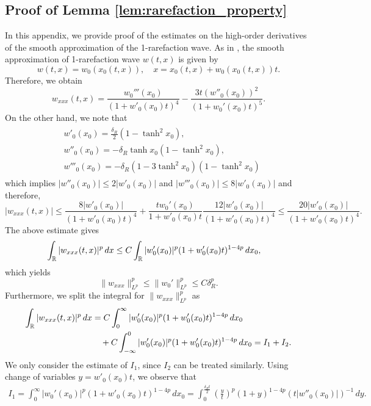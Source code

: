 \documentclass[11pt,reqno]{amsart}
\begin{document}
\begin{appendix}

\section{Proof of Lemma \ref{lem:rarefaction_property}}\label{sec:app-rarefaction-proof}
\setcounter{equation}{0}
In this appendix, we provide proof of the estimates on the high-order derivatives of the smooth approximation of the 1-rarefaction wave. As in \cite{MN86}, the smooth approximation of 1-rarefaction wave $w(t,x)$ is given by
\[w(t,x)=w_0(x_0(t,x)),\quad x=x_0(t,x)+w_0(x_0(t,x))t.\]
Therefore, we obtain
\[w_{xxx}(t,x) = \frac{w_0'''(x_0)}{(1+w'_0(x_0)t)^4}-\frac{3t(w''_0(x_0))^2}{(1+w_0'(x_0)t)^5}.\]
On the other hand, we note that
\begin{align}
	\begin{aligned}\label{w_0}
		&w'_0(x_0) = \frac{\delta_R}{2}(1-\tanh^2 x_0),\\
		&w''_0(x_0) = -\delta_R \tanh x_0 (1-\tanh^2 x_0),\\
		&w'''_0(x_0) = -\delta_R (1-3\tanh^2 x_0)(1-\tanh^2 x_0)
	\end{aligned}
\end{align}
which implies $|w''_0(x_0)|\le 2|w'_0(x_0)|$ and $|w'''_0(x_0)|\le 8|w'_0(x_0)|$ and therefore,
\[|w_{xxx}(t,x)|\le \frac{8|w'_0(x_0)|}{(1+w'_0(x_0)t)^4}+\frac{tw_0'(x_0)}{1+w'_0(x_0)t}\frac{12|w'_0(x_0)|}{(1+w'_0(x_0)t)^4}\le \frac{20|w'_0(x_0)|}{(1+w'_0(x_0)t)^4}.\]
The above estimate gives
\begin{align*}
	\int_{\mathbb{R}}|w_{xxx}(t,x)|^p\,dx&\le C\int_{\mathbb{R}} |w'_0(x_0)|^p(1+w'_0(x_0)t)^{1-4p}\,dx_0,
\end{align*}
which yields 
\begin{equation}\label{w_xxx-1}
	\|w_{xxx}\|_{L^p}^p\le \|w_0'\|_{L^p}^p\le C\delta_R^p.
\end{equation}
Furthermore, we split the integral for $\|w_{xxx}\|_{L^p}^p$ as
\begin{align*}
	\int_{\mathbb{R}} |w_{xxx}(t,x)|^p\,dx&=C\int_{0}^\infty |w_0'(x_0)|^p(1+w'_0(x_0)t)^{1-4p}\,dx_0\\
	&\quad +C\int_{-\infty}^0 |w_0'(x_0)|^p(1+w'_0(x_0)t)^{1-4p}\,dx_0=I_1+I_2.
\end{align*}
We only consider the estimate of $I_1$, since $I_2$ can be treated similarly. Using change of variables $y=w'_0(x_0)t$, we observe that
\begin{align*}
	I_1=\int_0^\infty |w_0'(x_0)|^p(1+w'_0(x_0)t)^{1-4p}\,dx_0=\int_0^{\frac{\delta_Rt}{2}}\left(\frac{y}{t}\right)^p(1+y)^{1-4p}(t|w''_0(x_0)|)^{-1}\,dy.

\end{align*}
\end{appendix}
\end{document}

